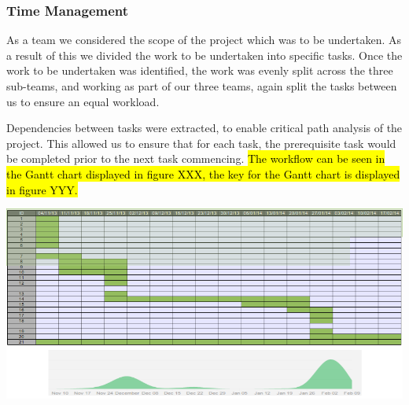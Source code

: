 \subsubsection{Time Management}
As a team we considered the scope of the project which was to be undertaken.
 As a result of this we divided the work to be undertaken into specific tasks.
 Once the work to be undertaken was identified, the work was evenly split across 
the three sub-teams, and working as part of our three teams, again split the 
 tasks between us to ensure an equal workload.
 
Dependencies between tasks were extracted, to enable critical path analysis of the project. 
This allowed us to ensure that for each task, the prerequisite task would be completed 
prior to the next task commencing. \hl{The workflow can be seen in the Gantt chart displayed in 
figure XXX, the key for the Gantt chart is displayed in figure YYY.}

\includegraphics[scale=0.48]{images/GanttChart.png}

